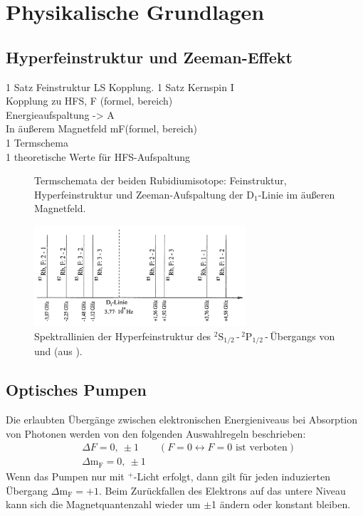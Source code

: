 \section{Physikalische Grundlagen}

\subsection{Hyperfeinstruktur und Zeeman-Effekt}
1 Satz Feinstruktur LS Kopplung. 1 Satz Kernspin I \\
Kopplung zu HFS, F (formel, bereich) \\
Energieaufspaltung -> A \\
In äußerem Magnetfeld mF(formel, bereich) \\
1 Termschema \\
1 theoretische Werte für HFS-Aufspaltung



\begin{figure}[H]
    \centering
    \def\svgwidth{0.85\textwidth}
    
    \caption{Termschemata der beiden Rubidiumisotope:
    Feinstruktur, Hyperfeinstruktur und Zeeman-Aufspaltung der D$_1$-Linie im äußeren Magnetfeld.}
    \label{img:termschema}
\end{figure}

\begin{figure}[H]
\begin{center}
  \includegraphics[width=0.7\textwidth]{../img/HFSspect_theo.png}
  \caption{Spektrallinien der Hyperfeinstruktur des ${}^2\text{S}_{1/2}$\,-\,${}^2\text{P}_{1/2}$\,-\,Übergangs
  von  und  (aus \cite{manual}).}
  \label{img:hfsspectrum}
\end{center}
\end{figure} 

\subsection{Optisches Pumpen}
Die erlaubten Übergänge zwischen elektronischen Energieniveaus bei Absorption von Photonen
werden von den folgenden Auswahlregeln beschrieben:
\begin{equation}
\begin{split}
  & \Delta F = 0, \ \pm 1 \qquad (F = 0 \leftrightarrow F = 0 \text{ ist verboten}) \\
  & \Delta \text{m}_\text{F} = 0, \ \pm 1
  \end{split}
\end{equation}
Wenn das Pumpen nur mit \textsigma$^+$-Licht erfolgt,
dann gilt für jeden induzierten Übergang \mbox{$\Delta \text{m}_\text{F} = +1$}.
Beim Zurückfallen des Elektrons auf das untere Niveau kann sich die Mag\-net\-quan\-ten\-zahl
wieder um $\pm$1 ändern oder konstant bleiben.

